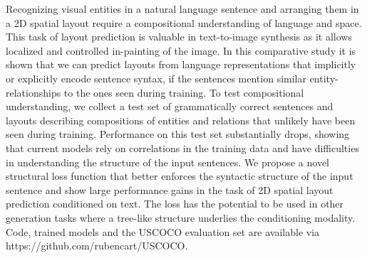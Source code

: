 Recognizing visual entities in a natural language sentence and arranging them in a 2D spatial layout require a compositional understanding of language and space. This task of layout prediction is valuable in text-to-image synthesis as it allows localized and controlled in-painting of the image. In this comparative study it is shown that we can predict layouts from language representations that implicitly or explicitly encode sentence syntax, if the sentences mention similar entity-relationships to the ones seen during training. To test compositional understanding, we collect a test set of grammatically correct sentences and layouts describing compositions of entities and relations that unlikely have been seen during training. Performance on this test set substantially drops, showing that current models rely on correlations in the training data and have difficulties in understanding the structure of the input sentences. We propose a novel structural loss function that better enforces the syntactic structure of the input sentence and show large performance gains in the task of 2D spatial layout prediction conditioned on text. The loss has the potential to be used in other generation tasks where a tree-like structure underlies the conditioning modality. Code, trained models and the USCOCO evaluation set are available via https://github.com/rubencart/USCOCO.